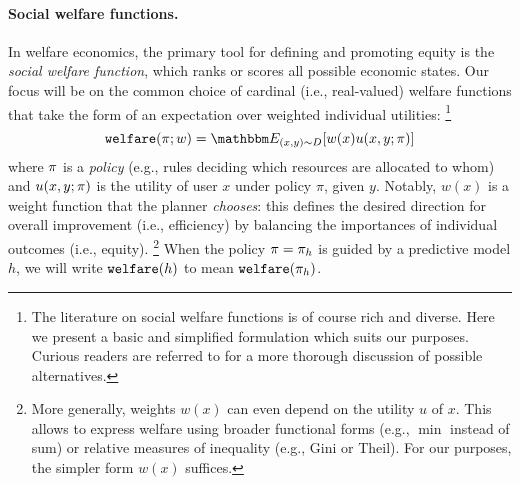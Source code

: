 \paragraph{Social welfare functions.}
In welfare economics,
the primary tool for defining and promoting equity 
is the \emph{social welfare function},
which ranks or scores all possible economic states.
Our focus will be on the common choice of cardinal (i.e., real-valued) welfare functions that take the form of an expectation over weighted individual utilities:%
\footnote{The literature on social welfare functions is of course rich and diverse. Here we present a basic and simplified formulation which suits our purposes. Curious readers are referred to \citep{adler2019measuring} for a more thorough discussion of possible alternatives.}
\begin{equation}
\label{eq:welfare}
\welf(\policy;w) = \expect{(x,y)\sim \dist}{w(x) u(x,y;\policy)}
\end{equation}
where ${\pi}$ is a \emph{policy}
(e.g., rules deciding which resources are allocated to whom)
and $u(x,y;{\pi})$ is the utility of user $x$ under policy $\pi$, given $y$.
Notably, $w(x)$ is a weight function that the planner \emph{chooses}:
this defines
the desired direction for overall improvement (i.e., efficiency)
by balancing the importances of individual outcomes (i.e., equity).%
\footnote{More generally, weights $w(x)$ can even depend on the utility $u$ of $x$. This allows to express welfare using broader functional forms
(e.g., $\min$ instead of sum) or relative measures of inequality (e.g., Gini or Theil). For our purposes, the simpler form $w(x)$ suffices.}
When the policy ${\pi}={\pi}_h$ is guided by a predictive model $h$,
we will write ${\mathtt{welfare}}(h)$ to mean ${\mathtt{welfare}}({\pi}_h)$.

